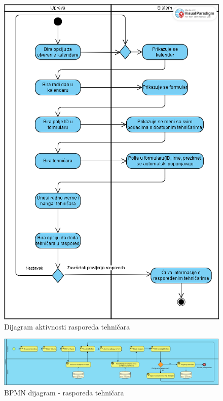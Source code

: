 \documentclass[a4paper]{article}
\begin{document}
\begin{figure}[H]
\begin{center}
\includegraphics[scale=0.5]{Dijagrami/Dijagrami_aktivnosti/Dijagram_aktivnosti_raspored_tehničara.png}
\end{center}
\caption{Dijagram aktivnosti rasporeda tehničara}
\label{fig:da_raspored_tehnicara}
\end{figure}

\begin{figure}[H]
\begin{center}
\includegraphics[scale=0.8, width = 1.3\textwidth]{Dijagrami/BPMN_Dijagrami/BPMN_rasporeda_tehničara.png}
\end{center}
\caption{BPMN dijagram - rasporeda tehničara}
\label{fig:da_raspored_tehnicara}
\end{figure}
\end{document}
